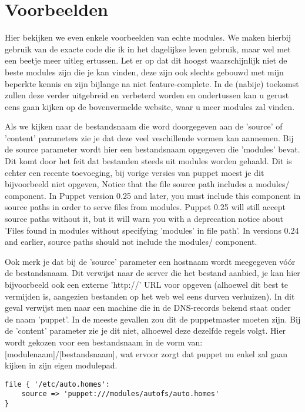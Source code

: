 \section{Voorbeelden}
Hier bekijken we even enkele voorbeelden van echte modules. We maken hierbij gebruik van de exacte code die ik in het dagelijkse leven gebruik, maar wel met een beetje meer uitleg ertussen. Let er op dat dit hoogst waarschijnlijk niet de beste modules zijn die je kan vinden, deze zijn ook slechts gebouwd met mijn beperkte kennis en zijn bijlange na niet feature-complete. In de (nabije) toekomst zullen deze verder uitgebreid en verbeterd worden en ondertussen kan u gerust eens gaan kijken op de bovenvermelde website, waar u meer modules zal vinden.
%



Als we kijken naar de bestandsnaam die word doorgegeven aan de 'source' of 'content' parameters zie je dat deze veel veschillende vormen kan aannemen. Bij de source parameter wordt hier een bestandsnaam opgegeven die 'modules' bevat. Dit komt door het feit dat bestanden steeds uit modules worden gehaald. Dit is echter een recente toevoeging, bij vorige versies van puppet moest je dit bijvoorbeeld niet opgeven,
Notice that the file source path includes a modules/ component. In Puppet version 0.25 and later, you must include this component in source paths in order to serve files from modules. Puppet 0.25 will still accept source paths without it, but it will warn you with a deprecation notice about 'Files found in modules without specifying 'modules' in file path'. In versions 0.24 and earlier, source paths should not include the modules/ component.

Ook merk je dat bij de 'source' parameter een hostnaam wordt meegegeven v\'o\'or de bestandsnaam. Dit verwijst naar de server die het bestand aanbied, je kan hier bijvoorbeeld ook een externe 'http://' URL voor opgeven (alhoewel dit best te vermijden is, aangezien bestanden op het web wel eens durven verhuizen). In dit geval verwijst men naar een machine die in de DNS-records bekend staat onder de naam 'puppet'. In de meeste gevallen zou dit de puppetmaster moeten zijn. Bij de 'content' parameter zie je dit niet, alhoewel deze dezelfde regels volgt. Hier wordt gekozen voor een bestandsnaam in de vorm van: [modulenaam]/[bestandsnaam], wat ervoor zorgt dat puppet nu enkel zal gaan kijken in zijn eigen modulepad.
%
\begin{code}
\begin{lstlisting}
file { '/etc/auto.homes':
    source => 'puppet:///modules/autofs/auto.homes'
}
\end{lstlisting}
\end{code}
